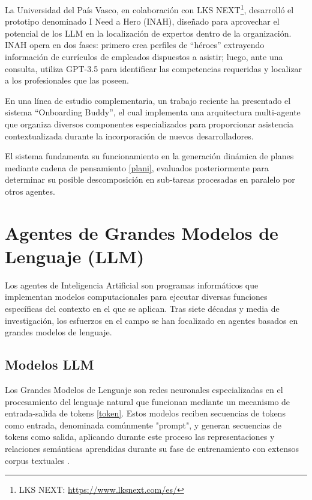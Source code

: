 La Universidad del País Vasco, en colaboración con LKS NEXT\footnote{LKS NEXT: \url{https://www.lksnext.com/es/}}, desarrolló el prototipo denominado I Need a Hero (INAH), diseñado para aprovechar el potencial de los LLM en la localización de expertos dentro de la organización\cite{azanza_can_2024}. INAH opera en dos fases: primero crea perfiles de ``héroes'' extrayendo información de currículos de empleados dispuestos a asistir; luego, ante una consulta, utiliza GPT-3.5 para identificar las competencias requeridas y localizar a los profesionales que las poseen.

En una línea de estudio complementaria, un trabajo reciente ha presentado el sistema ``Onboarding Buddy'', el cual implementa una arquitectura multi-agente que organiza diversos componentes especializados para proporcionar asistencia contextualizada durante la incorporación de nuevos desarrolladores\cite{ionescu_multi-agent_2025}.

El sistema fundamenta su funcionamiento en la generación dinámica de planes mediante cadena de pensamiento \ref{plani}, evaluados posteriormente para determinar su posible descomposición en sub-tareas procesadas en paralelo por otros agentes.

\section{Agentes de Grandes Modelos de Lenguaje (LLM)}

Los agentes de Inteligencia Artificial son programas informáticos que implementan modelos computacionales para ejecutar diversas funciones específicas del contexto en el que se aplican. Tras siete décadas y media de investigación, los esfuerzos en el campo se han focalizado en agentes basados en grandes modelos de lenguaje. 

\subsection{Modelos LLM}

Los Grandes Modelos de Lenguaje son redes neuronales especializadas en el procesamiento del lenguaje natural que funcionan mediante un mecanismo de entrada-salida de tokens \ref{token}. Estos modelos reciben secuencias de tokens como entrada, denominada comúnmente "prompt", y generan secuencias de tokens como salida, aplicando durante este proceso las representaciones y relaciones semánticas aprendidas durante su fase de entrenamiento con extensos corpus textuales \cite{vaswani_attention_2023}.


